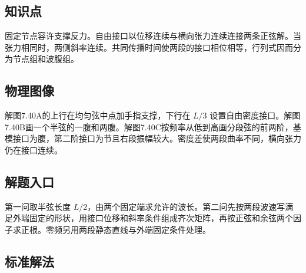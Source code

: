 \documentclass[UTF8,fontset=fandol,a4paper,11pt]{ctexart}
\begin{document}


\subsection*{知识点}

固定节点容许支撑反力。自由接口以位移连续与横向张力连续连接两条正弦解。当张力相同时，两侧斜率连续。共同传播时间使两段的接口相位相等，行列式因而分为节点组和波腹组。




\subsection*{物理图像}

解图7.40A的上行在均匀弦中点加手指支撑，下行在 $L/3$ 设置自由密度接口。解图7.40B画一个半弦的一腹和两腹。解图7.40C按频率从低到高画分段弦的前两阶，基模接口为腹，第二阶接口为节且右段振幅较大。密度差使两段曲率不同，横向张力仍在接口连续。




\subsection*{解题入口}

第一问取半弦长度 $L/2$，由两个固定端求允许的波长。第二问先按两段波速写满足外端固定的形状，用接口位移和斜率条件组成齐次矩阵，再按正弦和余弦两个因子求正根。零频另用两段静态直线与外端固定条件处理。



\subsection*{标准解法}
\end{document}
